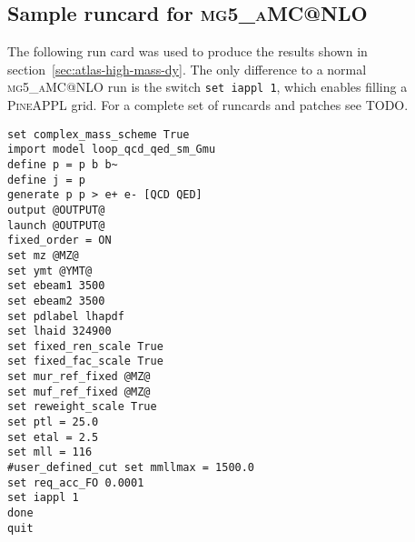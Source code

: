 \subsection{Sample runcard for \texorpdfstring{\textsc{mg5\_aMC@NLO}}{mg5\_aMC@NLO}}
\label{app:sample-runcard}

The following run card was used to produce the results shown in section~\ref{sec:atlas-high-mass-dy}.
The only difference to a normal \textsc{mg5\_aMC@NLO} run is the switch \texttt{set iappl 1}, which enables filling a \textsc{PineAPPL} grid.
For a complete set of runcards and patches see TODO.


\begin{lstlisting}
set complex_mass_scheme True
import model loop_qcd_qed_sm_Gmu
define p = p b b~
define j = p
generate p p > e+ e- [QCD QED]
output @OUTPUT@
launch @OUTPUT@
fixed_order = ON
set mz @MZ@
set ymt @YMT@
set ebeam1 3500
set ebeam2 3500
set pdlabel lhapdf
set lhaid 324900
set fixed_ren_scale True
set fixed_fac_scale True
set mur_ref_fixed @MZ@
set muf_ref_fixed @MZ@
set reweight_scale True
set ptl = 25.0
set etal = 2.5
set mll = 116
#user_defined_cut set mmllmax = 1500.0
set req_acc_FO 0.0001
set iappl 1
done
quit
\end{lstlisting}
